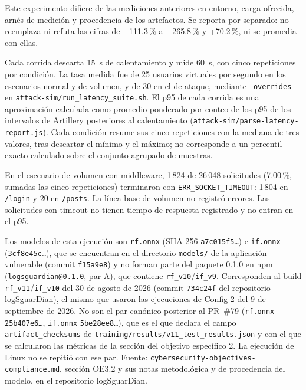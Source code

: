 Este experimento difiere de las mediciones anteriores en entorno, carga ofrecida, arnés de medición y procedencia de los artefactos. Se reporta por separado: no reemplaza ni refuta las cifras de +111.3\,\% a +265.8\,\% y +70.2\,\%, ni se promedia con ellas.

Cada corrida descarta 15~s de calentamiento y mide 60~s, con cinco repeticiones por condición. La tasa medida fue de 25 usuarios virtuales por segundo en los escenarios normal y de volumen, y de 30 en el de ataque, mediante \texttt{--overrides} en \texttt{attack-sim/run\_latency\_suite.sh}. El p95 de cada corrida es una aproximación calculada como promedio ponderado por conteo de los p95 de los intervalos de Artillery posteriores al calentamiento (\texttt{attack-sim/parse-latency-report.js}). Cada condición resume sus cinco repeticiones con la mediana de tres valores, tras descartar el mínimo y el máximo; no corresponde a un percentil exacto calculado sobre el conjunto agrupado de muestras.

En el escenario de volumen con middleware, 1\,824 de 26\,048 solicitudes (7.00\,\%, sumadas las cinco repeticiones) terminaron con \texttt{ERR\_SOCKET\_TIMEOUT}: 1\,804 en \texttt{/login} y 20 en \texttt{/posts}. La línea base de volumen no registró errores. Las solicitudes con timeout no tienen tiempo de respuesta registrado y no entran en el p95.

{\sloppy Los modelos de esta ejecución son \texttt{rf.onnx} (SHA-256 \texttt{a7c015f5\ldots}) e \texttt{if.onnx} (\texttt{3cf8e45c\ldots}), que se encuentran en el directorio \texttt{models/} de la aplicación vulnerable (commit \texttt{f15a9e8}) y no forman parte del paquete 0.1.0 en npm (\texttt{logsguardian@0.1.0}, par A), que contiene \texttt{rf\_v10}/\texttt{if\_v9}. Corresponden al build \texttt{rf\_v11}/\texttt{if\_v10} del 30 de agosto de 2026 (commit \texttt{734c24f} del repositorio logSguarDian), el mismo que usaron las ejecuciones de Config 2 del 9 de septiembre de 2026. No son el par canónico posterior al PR~\#79 (\texttt{rf.onnx} \texttt{25b407e6\ldots}, \texttt{if.onnx} \texttt{5be28ee8\ldots}), que es el que declara el campo \texttt{artifact\_checksums} de \texttt{training/results/v11\_test\_results.json} y con el que se calcularon las métricas de la sección del objetivo específico 2. La ejecución de Linux no se repitió con ese par. Fuente: \texttt{cybersecurity-\allowbreak objectives-\allowbreak compliance.md}, sección OE3.2 y sus notas metodológica y de procedencia del modelo, en el repositorio logSguarDian.\par}

